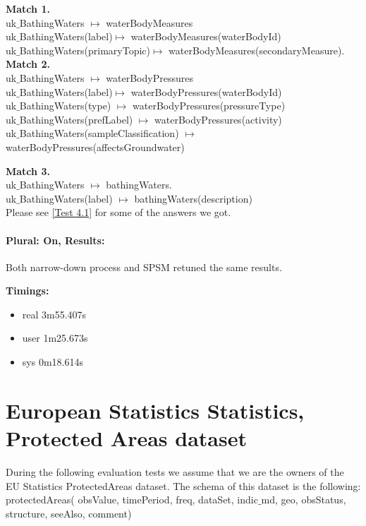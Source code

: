 \documentclass[a4paper,10pt]{article}
\begin{document}
\textbf{Match 1.}\\
uk$\_$BathingWaters $\mapsto$ waterBodyMeasures\\
uk$\_$BathingWaters(label)$\mapsto$ waterBodyMeasures(waterBodyId)\\
uk$\_$BathingWaters(primaryTopic)$\mapsto$ waterBodyMeasures(secondaryMeasure).\\

\textbf{Match 2.}\\
uk$\_$BathingWaters $\mapsto$ waterBodyPressures\\
uk$\_$BathingWaters(label)$\mapsto$  waterBodyPressures(waterBodyId)\\
uk$\_$BathingWaters(type) $\mapsto$ waterBodyPressures(pressureType)\\
uk$\_$BathingWaters(prefLabel) $\mapsto$ waterBodyPressures(activity)\\
uk$\_$BathingWaters(sampleClassification) $\mapsto$  waterBodyPressures(affectsGroundwater)

\textbf{Match 3.}\\
uk$\_$BathingWaters $\mapsto$ bathingWaters.\\
uk$\_$BathingWaters(label) $\mapsto$ bathingWaters(description)\\


Please see \ref{Test 4.1} for some of the answers we got.

\paragraph{Plural: On, Results: } Both narrow-down process and SPSM retuned the same results.

\textbf{Timings: }
\begin{itemize}
\item real	3m55.407s
\item user	1m25.673s
\item sys	0m18.614s

\end{itemize}



\section{European Statistics Statistics, Protected Areas dataset}
During the following evaluation tests we assume that we are the owners of the EU Statistics ProtectedAreas dataset. The schema of this dataset is the following:\\
\indent  protectedAreas( obsValue, timePeriod, freq, dataSet, indic$\_$md, geo, obsStatus, structure, seeAlso, comment) 
\end{document}
